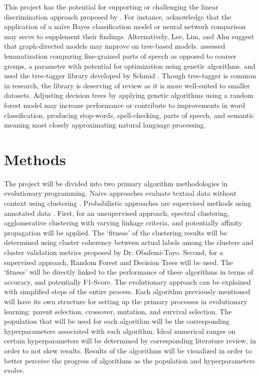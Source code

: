 \documentclass{article}
\begin{document}
This project has the potential for supporting or challenging the linear discrimination approach proposed by \citep{baayen2019discriminative}. For instance, \citep{baayen2019discriminative} acknowledge that the application of a naïve Bayes classification model or neural network comparison may serve to supplement their findings. Alternatively, Lee, Lim, and Ahn \citep{lee2019automotive} suggest that graph-directed models may improve on tree-based models. \cite{gleim2019practitioner} assessed lemmatization comparing fine-grained parts of speech as opposed to coarser groups, a parameter with potential for optimization using genetic algorithms. \citep{baayen2019discriminative} and \citep{buchanan_dedeyne_montefinese_2019} used the tree-tagger library developed by Schmid \citep{schmid1994probabilistic, schmid1999improvements}. Though tree-tagger is common in research, the library is deserving of review as it is more well-suited to smaller datasets. Adjusting decision trees by applying genetic algorithms using a random forest model may increase performance or contribute to improvements in word classification, producing stop-words, spell-checking, parts of speech, and semantic meaning most closely approximating natural language processing. 

\section{Methods}

The project will be divided into two primary algorithm methodologies in evolutionary programming. Naive approaches evaluate textual data without context using clustering \citep{bungum2010evolutionary}. Probabilistic approaches are supervised methods using annotated data \citep{bungum2010evolutionary}. First, for an unsupervised approach, spectral clustering, agglomerative clustering with varying linkage criteria, and potentially affinity propagation will be applied. The ‘fitness’ of the clustering results will be determined using cluster coherency between actual labels among the clusters and cluster validation metrics proposed by Dr. Obafemi-Tayo. Second, for a supervised approach, Random Forest and Decision Trees will be used. The ‘fitness’ will be directly linked to the performance of these algorithms in terms of accuracy, and potentially F1-Score. The evolutionary approach can be explained with simplified steps of the entire process. Each algorithm previously mentioned will have its own structure for setting up the primary processes in evolutionary learning: parent selection, crossover, mutation, and survival selection. The population that will be used for each algorithm will be the corresponding hyperparameters associated with each algorithm. Ideal numerical ranges on certain hyperparameters will be determined by corresponding literature review, in order to not skew results. Results of the algorithms will be visualized in order to better perceive the progress of algorithms as the population and hyperparameters evolve. 
\end{document}
